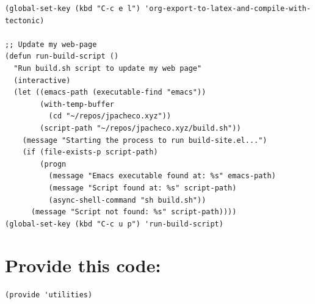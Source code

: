 \documentclass[11pt]{article}
\begin{document}
\begin{verbatim}
(global-set-key (kbd "C-c e l") 'org-export-to-latex-and-compile-with-tectonic)

;; Update my web-page
(defun run-build-script ()
  "Run build.sh script to update my web page"
  (interactive)
  (let ((emacs-path (executable-find "emacs"))
        (with-temp-buffer
          (cd "~/repos/jpacheco.xyz"))
        (script-path "~/repos/jpacheco.xyz/build.sh"))
    (message "Starting the process to run build-site.el...")
    (if (file-exists-p script-path)
        (progn
          (message "Emacs executable found at: %s" emacs-path)
          (message "Script found at: %s" script-path)
          (async-shell-command "sh build.sh"))
      (message "Script not found: %s" script-path))))
(global-set-key (kbd "C-c u p") 'run-build-script)
\end{verbatim}
\section{Provide this code:}
\label{sec:orgaa27c14}
\begin{verbatim}
(provide 'utilities)
\end{verbatim}
\end{document}
